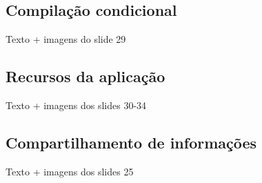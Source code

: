 \subsection{Compilação condicional}

Texto + imagens do slide 29


\subsection{Recursos da aplicação}

Texto + imagens dos slides 30-34


\subsection{Compartilhamento de informações}

Texto + imagens dos slides 25

